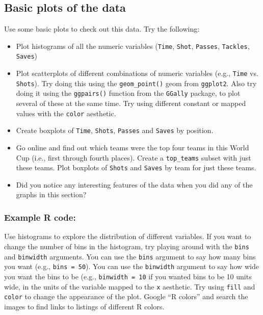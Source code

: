 \documentclass[]{book}
\providecommand{\tightlist}{%
  \setlength{\itemsep}{0pt}\setlength{\parskip}{0pt}}
\begin{document}
\subsection{Basic plots of the data}\label{basic-plots-of-the-data}

Use some basic plots to check out this data. Try the following:

\begin{itemize}
\tightlist
\item
  Plot histograms of all the numeric variables (\texttt{Time},
  \texttt{Shot}, \texttt{Passes}, \texttt{Tackles}, \texttt{Saves})
\item
  Plot scatterplots of different combinations of numeric variables
  (e.g., \texttt{Time} vs. \texttt{Shots}). Try doing this using the
  \texttt{geom\_point()} geom from \texttt{ggplot2}. Also try doing it
  using the \texttt{ggpairs()} function from the \texttt{GGally}
  package, to plot several of these at the same time. Try using
  different constant or mapped values with the \texttt{color} aesthetic.
\item
  Create boxplots of \texttt{Time}, \texttt{Shots}, \texttt{Passes} and
  \texttt{Saves} by position.
\item
  Go online and find out which teams were the top four teams in this
  World Cup (i.e., first through fourth places). Create a
  \texttt{top\_teams} subset with just these teams. Plot boxplots of
  \texttt{Shots} and \texttt{Saves} by team for just these teams.
\item
  Did you notice any interesting features of the data when you did any
  of the graphs in this section?
\end{itemize}

\subsubsection{Example R code:}\label{example-r-code-1}

Use histograms to explore the distribution of different variables. If
you want to change the number of bins in the histogram, try playing
around with the \texttt{bins} and \texttt{binwidth} arguments. You can
use the \texttt{bins} argument to say how many bins you want (e.g.,
\texttt{bins\ =\ 50}). You can use the \texttt{binwidth} argument to say
how wide you want the bins to be (e.g., \texttt{binwidth\ =\ 10} if you
wanted bins to be 10 units wide, in the units of the variable mapped to
the \texttt{x} aesthetic. Try using \texttt{fill} and \texttt{color} to
change the appearance of the plot. Google ``R colors'' and search the
images to find links to listings of different R colors.
\end{document}
